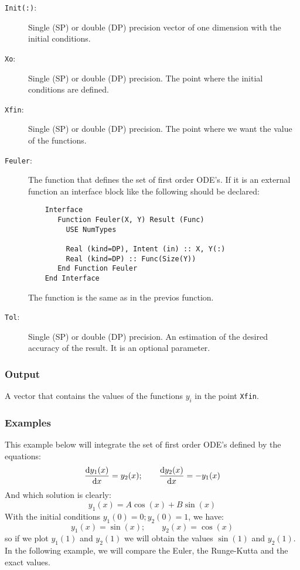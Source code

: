 \begin{description}
\item[\texttt{Init(:)}:] Single (SP) or double (DP) precision vector of
  one dimension with the initial conditions.
\item[\texttt{Xo}:] Single (SP) or double (DP) precision. The point
  where the initial conditions are defined.
\item[\texttt{Xfin}:] Single (SP) or double (DP) precision. The point
  where we want the value of the functions.
\item[\texttt{Feuler}:] The function that defines the set of first order
  ODE's. If it is an external function an interface block like the
  following should be declared: 
\begin{verbatim}
    Interface
       Function Feuler(X, Y) Result (Func)
         USE NumTypes

         Real (kind=DP), Intent (in) :: X, Y(:)
         Real (kind=DP) :: Func(Size(Y))
       End Function Feuler
    End Interface
\end{verbatim}
The function is the same as in the previos function.
\item[\texttt{Tol}:] Single (SP) or double (DP) precision. An
  estimation of the desired accuracy of the result. It is an optional
  parameter.
\end{description}

\subsubsection{Output}

A vector that contains the values of the functions $y_i$ in the point
\texttt{Xfin}. 

\subsubsection{Examples}

This example below will integrate the set of first order ODE's defined
by the equations:
\begin{displaymath}
  \frac{\mathrm{d} y_1(x)}{\mathrm{d} x} = y_2(x);\qquad
  \frac{\mathrm{d} y_2(x)}{\mathrm{d} x} = -y_1(x)    
\end{displaymath}
And which solution is clearly:
\begin{displaymath}
  y_1(x) = A\cos(x) + B\sin(x)
\end{displaymath}
With the initial conditions $y_1(0) = 0; y_2(0)=1$, we have:
\begin{displaymath}
  y_1(x) = \sin(x);\qquad y_2(x) = \cos(x)
\end{displaymath}
so if we plot $y_1(1)$ and $y_2(1)$ we will obtain the values
$\sin(1)$ and $y_2(1)$. In the following example, we will compare the
Euler, the Runge-Kutta and the exact values.

